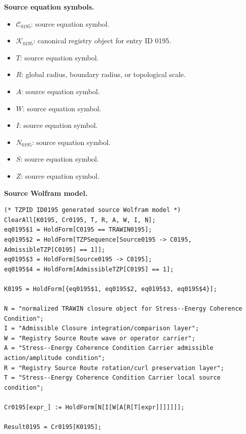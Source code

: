 \begin{minipage}[t]{0.49\linewidth}
\begingroup
\small
\raggedright
\textbf{Source equation symbols.}\par
\begin{itemize}[leftmargin=1.35em,itemsep=1pt,topsep=1pt,parsep=0pt]
    \item $\mathcal{C}_{0195}$: source equation symbol.
    \item $\mathcal{K}_{0195}$: canonical registry object for entry ID 0195.
    \item $T$: source equation symbol.
    \item $R$: global radius, boundary radius, or topological scale.
    \item $A$: source equation symbol.
    \item $W$: source equation symbol.
    \item $I$: source equation symbol.
    \item $N_{0195}$: source equation symbol.
    \item $S$: source equation symbol.
    \item $Z$: source equation symbol.
\end{itemize}
\endgroup
\end{minipage}\hfill
\begin{minipage}[t]{0.47\linewidth}
\begingroup
\scriptsize
\raggedright
\textbf{Source Wolfram model.}\par
\begin{Verbatim}[fontsize=\tiny,breaklines=true,breakanywhere=true]
(* TZPID ID0195 generated source Wolfram model *)
ClearAll[K0195, Cr0195, T, R, A, W, I, N];
eq0195$1 = HoldForm[C0195 == TRAWIN0195];
eq0195$2 = HoldForm[TZPSequence[Source0195 -> C0195, AdmissibleTZP[C0195] == 1]];
eq0195$3 = HoldForm[Source0195 -> C0195];
eq0195$4 = HoldForm[AdmissibleTZP[C0195] == 1];

K0195 = HoldForm[{eq0195$1, eq0195$2, eq0195$3, eq0195$4}];

N = "normalized TRAWIN closure object for Stress--Energy Coherence Condition";
I = "Admissible Closure integration/comparison layer";
W = "Registry Source Route wave or operator carrier";
A = "Stress--Energy Coherence Condition Carrier admissible action/amplitude condition";
R = "Registry Source Route rotation/curl preservation layer";
T = "Stress--Energy Coherence Condition Carrier local source condition";

Cr0195[expr_] := HoldForm[N[I[W[A[R[T[expr]]]]]]];

Result0195 = Cr0195[K0195];
\end{Verbatim}
\endgroup
\end{minipage}

